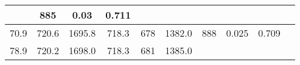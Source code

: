 \documentclass[a4paper,10pt]{article}
\begin{document}
\begin{longtable}{
     |
%    
    c|
%    
    c|
%    
    c|
%    
    c|
%    
    c|
%    
    c|
%    
    c|
%    
    c|
%    
    c|
%    
    c|
%    
    }
%        
        & 885
%        

%        

%        
        & 0.03
%        

%        

%        
        & 0.711
%        

%        
        \\
        \hline

        

%        

%        
        70.9
%        

%        

%        
        & 720.6
%        

%        

%        
        & 1695.8
%        

%        

%        
        & 718.3
%        

%        

%        
        & 678
%        

%        

%        
        & 1382.0
%        

%        

%        
        & 888
%        

%        

%        
        & 0.025
%        

%        

%        
        & 0.709
%        

%        
        \\
        \hline

        

%        

%        
        78.9
%        

%        

%        
        & 720.2
%        

%        

%        
        & 1698.0
%        

%        

%        
        & 718.3
%        

%        

%        
        & 681
%        

%        

%        
        & 1385.0
%        

%        


\end{longtable}
\end{document}
